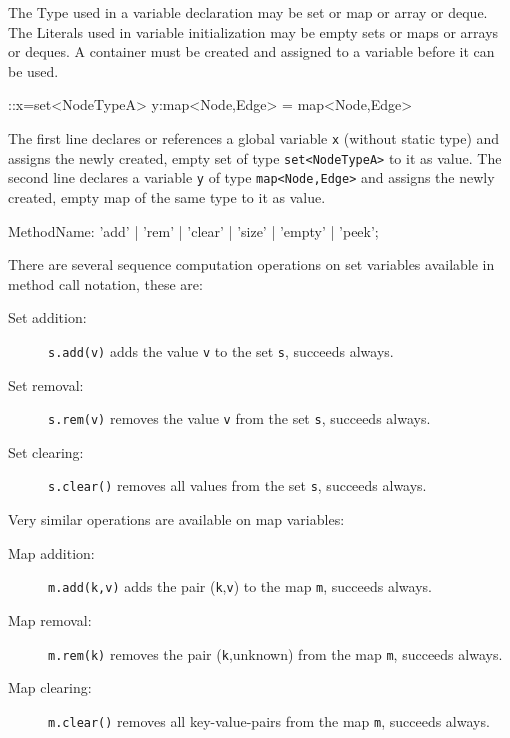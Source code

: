 The Type used in a variable declaration may be set or map or array or deque.
The Literals used in variable initialization may be empty sets or maps or arrays or deques.
A container must be created and assigned to a variable before it can be used.

\begin{example}
\begin{grgen}
::x=set<NodeTypeA>{}
y:map<Node,Edge> = map<Node,Edge>{}
\end{grgen}
The first line declares or references a global variable \texttt{x} (without static type) and assigns the newly created, empty set of type \texttt{set<NodeTypeA>} to it as value.
The second line declares a variable \texttt{y} of type \texttt{map<Node,Edge>} and assigns the newly created, empty map of the same type to it as value.
\end{example}

\begin{rail}
  MethodName: 'add' | 'rem' | 'clear' | 'size' | 'empty' | 'peek';
\end{rail}

\noindent There are several sequence computation operations on set variables available in method call notation, these are:

\begin{description}
\item[Set addition:] \texttt{s.add(v)} adds the value \texttt{v} to the set \texttt{s}, succeeds always.
\item[Set removal:] \texttt{s.rem(v)} removes the value \texttt{v} from the set \texttt{s}, succeeds always.
\item[Set clearing:] \texttt{s.clear()} removes all values from the set \texttt{s}, succeeds always.
\end{description}

\noindent Very similar operations are available on map variables:

\begin{description}
\item[Map addition:] \texttt{m.add(k,v)} adds the pair (\texttt{k},\texttt{v}) to the map \texttt{m}, succeeds always.
\item[Map removal:] \texttt{m.rem(k)} removes the pair (\texttt{k},unknown) from the map \texttt{m}, succeeds always.
\item[Map clearing:] \texttt{m.clear()} removes all key-value-pairs from the map \texttt{m}, succeeds always.
\end{description}

